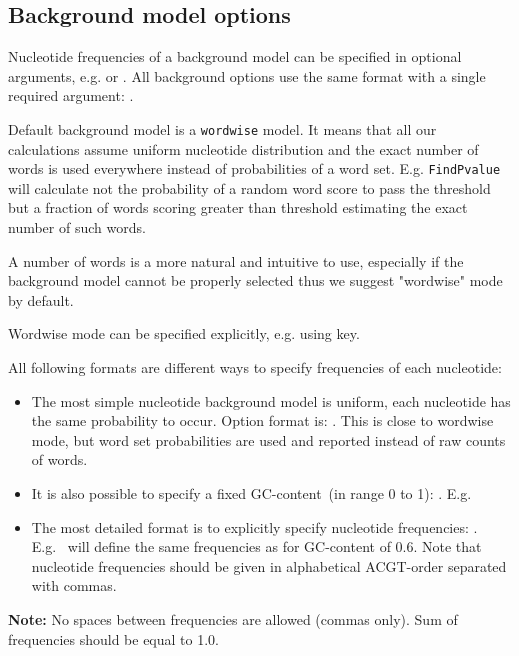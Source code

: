\subsection{Background model options}
Nucleotide frequencies of a background model can be specified in optional arguments, e.g.  or . All background options use the same format with a single required argument: .

Default background model is a \texttt{wordwise} model. It means that all our calculations assume uniform nucleotide distribution and the exact number of words is used everywhere instead of probabilities of a word set.
E.g. \texttt{FindPvalue} will calculate not the probability of a random word score to pass the threshold but a fraction of words scoring greater than threshold estimating the exact number of such words.

A number of words is a more natural and intuitive to use, especially if the background model cannot be properly selected
thus we suggest "wordwise" mode by default.

Wordwise mode can be specified explicitly, e.g. using  key.

All following formats are different ways to specify frequencies of each nucleotide:
\begin{itemize}
\item The most simple nucleotide background model is uniform, each nucleotide has the same probability to occur. Option format is: . This is close to wordwise mode, but word set probabilities are used and reported instead of raw counts of words.
\item It is also possible to specify a fixed GC-content~(in range 0 to 1): . E.g.~
\item The most detailed format is to explicitly specify nucleotide frequencies: . E.g.~ will define the same frequencies as for GC-content of 0.6. Note that nucleotide frequencies should be given in alphabetical ACGT-order separated with commas. 
\end{itemize}

\textbf{Note:} No spaces between frequencies are allowed (commas only). Sum of frequencies should be equal to 1.0.
